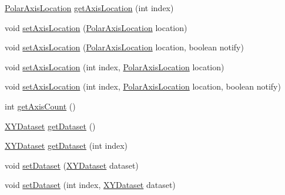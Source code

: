 \begin{DoxyCompactItemize}
\item 
\mbox{\hyperlink{classorg_1_1jfree_1_1chart_1_1plot_1_1_polar_axis_location}{Polar\+Axis\+Location}} \mbox{\hyperlink{classorg_1_1jfree_1_1chart_1_1plot_1_1_polar_plot_ae5d05ba6ea1035092f706a79bf21ef1c}{get\+Axis\+Location}} (int index)
\item 
void \mbox{\hyperlink{classorg_1_1jfree_1_1chart_1_1plot_1_1_polar_plot_a37bd0cf26d57341883faca5e3d4848c5}{set\+Axis\+Location}} (\mbox{\hyperlink{classorg_1_1jfree_1_1chart_1_1plot_1_1_polar_axis_location}{Polar\+Axis\+Location}} location)
\item 
void \mbox{\hyperlink{classorg_1_1jfree_1_1chart_1_1plot_1_1_polar_plot_aec28b339e2ae28cd8022f90d941e2354}{set\+Axis\+Location}} (\mbox{\hyperlink{classorg_1_1jfree_1_1chart_1_1plot_1_1_polar_axis_location}{Polar\+Axis\+Location}} location, boolean notify)
\item 
void \mbox{\hyperlink{classorg_1_1jfree_1_1chart_1_1plot_1_1_polar_plot_aa546acbfeb18c870e59eea53057ac79b}{set\+Axis\+Location}} (int index, \mbox{\hyperlink{classorg_1_1jfree_1_1chart_1_1plot_1_1_polar_axis_location}{Polar\+Axis\+Location}} location)
\item 
void \mbox{\hyperlink{classorg_1_1jfree_1_1chart_1_1plot_1_1_polar_plot_aac709edba3221df6fe1154c0db6d1d69}{set\+Axis\+Location}} (int index, \mbox{\hyperlink{classorg_1_1jfree_1_1chart_1_1plot_1_1_polar_axis_location}{Polar\+Axis\+Location}} location, boolean notify)
\item 
int \mbox{\hyperlink{classorg_1_1jfree_1_1chart_1_1plot_1_1_polar_plot_a35d901d725a129506171eff39f5bfe11}{get\+Axis\+Count}} ()
\item 
\mbox{\hyperlink{interfaceorg_1_1jfree_1_1data_1_1xy_1_1_x_y_dataset}{X\+Y\+Dataset}} \mbox{\hyperlink{classorg_1_1jfree_1_1chart_1_1plot_1_1_polar_plot_a892ef9a10b53bb72c6f6ccc003236f9a}{get\+Dataset}} ()
\item 
\mbox{\hyperlink{interfaceorg_1_1jfree_1_1data_1_1xy_1_1_x_y_dataset}{X\+Y\+Dataset}} \mbox{\hyperlink{classorg_1_1jfree_1_1chart_1_1plot_1_1_polar_plot_af389ea8f23f5fa9343c96faa7f8fddbb}{get\+Dataset}} (int index)
\item 
void \mbox{\hyperlink{classorg_1_1jfree_1_1chart_1_1plot_1_1_polar_plot_a6efa675b137d949333947bb975095865}{set\+Dataset}} (\mbox{\hyperlink{interfaceorg_1_1jfree_1_1data_1_1xy_1_1_x_y_dataset}{X\+Y\+Dataset}} dataset)
\item 
void \mbox{\hyperlink{classorg_1_1jfree_1_1chart_1_1plot_1_1_polar_plot_a281f527dd6ecc96f700fd97304c1b9d5}{set\+Dataset}} (int index, \mbox{\hyperlink{interfaceorg_1_1jfree_1_1data_1_1xy_1_1_x_y_dataset}{X\+Y\+Dataset}} dataset)

\end{DoxyCompactItemize}
